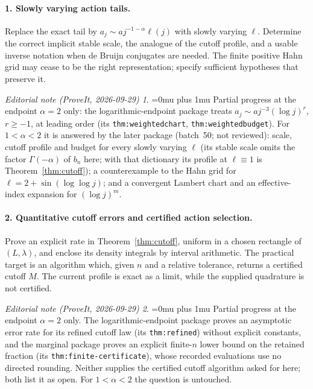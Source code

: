 \documentclass[11pt,a4paper]{article}
\numberwithin{equation}{section}
\theoremstyle{definition}
\theoremstyle{remark}
\newtheorem*{ednoteinner}{Editorial note (ProveIt, 2026-09-29)}
\newenvironment{ednote}{\begin{ednoteinner}\sloppy\Urlmuskip=0mu plus 1mu\relax}{\end{ednoteinner}}
\begin{document}
\paragraph{1. Slowly varying action tails.}
Replace the exact tail by $a_j\sim a j^{-1-\alpha}\ell(j)$ with slowly
varying $\ell$. Determine the correct implicit stable scale, the analogue
of the cutoff profile, and a usable inverse notation when de Bruijn
conjugates are needed. The finite positive Hahn grid may cease to be the
right representation; specify sufficient hypotheses that preserve it.
\begin{ednote}
Partial progress at the endpoint $\alpha=2$ only: the logarithmic-endpoint
package \cite{ed:lce} treats $a_j\sim a j^{-3}(\log j)^r$, $r\ge-1$, at
leading order (its \texttt{thm:weightedchart}, \texttt{thm:weightedbudget}).
For $1<\alpha<2$ it is answered by the later package
 (batch~50; not
reviewed): scale, cutoff profile and budget for every slowly varying $\ell$
(its stable scale omits the factor $\Gamma(-\alpha)$ of $b_n$ here; with that
dictionary its profile at $\ell\equiv1$ is Theorem~\ref{thm:cutoff}); a
counterexample to the Hahn grid for $\ell=2+\sin(\log\log j)$; and a
convergent Lambert chart and an effective-index expansion for $(\log j)^m$.
\end{ednote}

\paragraph{2. Quantitative cutoff errors and certified action selection.}
Prove an explicit rate in Theorem~\ref{thm:cutoff}, uniform in a chosen
rectangle of $(L,\lambda)$, and enclose its density integrals by interval
arithmetic. The practical target is an algorithm which, given $n$ and a
relative tolerance, returns a certified cutoff $M$. The current profile
is exact as a limit, while the supplied quadrature is not certified.
\begin{ednote}
Partial progress at the endpoint $\alpha=2$ only. The logarithmic-endpoint
package \cite{ed:lce} proves an asymptotic error rate for its refined
cutoff law (its \texttt{thm:refined}) without explicit constants, and the
marginal package \cite{ed:mct} proves an explicit finite-$n$ lower bound on
the retained fraction (its \texttt{thm:finite-certificate}), whose recorded
evaluations use no directed rounding. Neither supplies the certified cutoff
algorithm asked for here; both list it as open. For $1<\alpha<2$ the
question is untouched.
\end{ednote}
\end{document}

